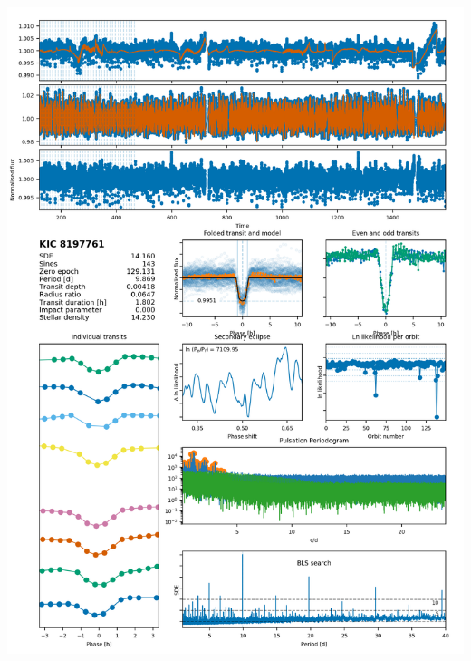 \documentclass{aastex62}
\begin{document}
\newpage

% 
\includegraphics[width=\textwidth]{../notebooks/plots_8197761.png}





\end{document}
